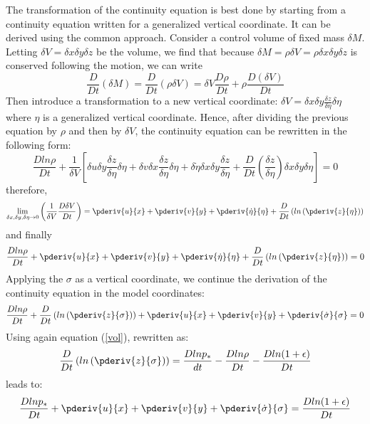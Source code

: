 The transformation of the continuity equation is best done by starting from a continuity equation written for a generalized vertical coordinate.
It can be derived using the common approach. Consider a control volume of fixed mass $\delta M$. Letting $\delta V=\delta x\delta y \delta z$ be the volume, we find that because $\delta M=\rho\delta V=\rho\delta x\delta y \delta z$ is conserved following the motion, we can write
\begin{equation}
\frac{D}{Dt}(\delta M)=\frac{D}{Dt}(\rho\delta V)=\delta V\frac{D\rho}{Dt}+\rho\frac{D(\delta V)}{Dt}
\end{equation}
Then introduce a transformation to a new vertical coordinate: $\delta V=\delta x\delta y \frac{\delta z}{\delta\eta}\delta\eta$ where $\eta$ is a generalized vertical coordinate. Hence, after dividing the previous equation by $\rho$ and then by $\delta V$,  the continuity equation can be rewritten in the following form:
\begin{equation}
\frac{Dln\rho}{Dt}+\frac{1}{\delta V}\left[\delta u\delta y\frac{\delta z}{\delta \eta}\delta\eta+\delta v\delta x \frac{\delta z}{\delta\eta}\delta\eta+\delta\dot{\eta}\delta x\delta y \frac{\delta z}{\delta \eta}+\frac{D}{Dt}\left(\frac{\delta z}{\delta\eta}\right)\delta x\delta y\delta \eta\right]=0
\end{equation}
therefore,
\begin{equation}
\lim_{\delta x, \delta y, \delta \eta \to 0}\left(\frac{1}{\delta V}\frac{D\delta V}{Dt}\right)=\pderiv{u}{x}+\pderiv{v}{y}+\pderiv{\dot{\eta}}{\eta}+\frac{D}{Dt}\left(ln\left(\pderiv{z}{\eta}\right)\right)
\end{equation}
and finally
\begin{equation}
\frac{Dln\rho}{Dt}+\pderiv{u}{x}+\pderiv{v}{y}+\pderiv{\dot{\eta}}{\eta}+\frac{D}{Dt}\left(ln\left(\pderiv{z}{\eta}\right)\right)=0
\end{equation}
Applying the $\sigma$ as a vertical coordinate, we continue the derivation of the continuity equation in the model coordinates:
\begin{equation}
\frac{Dln\rho}{Dt}+\frac{D}{Dt}\left(ln\left(\pderiv{z}{\sigma}\right)\right)+\pderiv{u}{x}+\pderiv{v}{y}+\pderiv{\dot{\sigma}}{\sigma}=0
\end{equation}
Using again equation (\ref{vol}), rewritten as:
\begin{equation}
\frac{D}{Dt}\left(ln\left(\pderiv{z}{\sigma}\right)\right)=\frac{Dlnp_*}{dt}-\frac{Dln\rho}{Dt}-\frac{Dln(1+\epsilon)}{Dt}
\end{equation}
leads to:
\begin{equation}
\frac{Dlnp_*}{Dt}+\pderiv{u}{x}+\pderiv{v}{y}+\pderiv{\dot{\sigma}}{\sigma}=\frac{Dln(1+\epsilon)}{Dt}
\end{equation}

